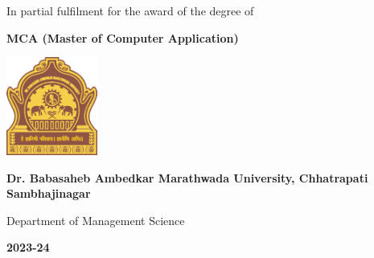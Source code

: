 \begin{titlepage}
{\begin{minipage}{\dimexpr\textwidth-2\fboxsep-2\fboxrule\relax}
\begin{center}
    {In partial fulfilment for the award of the degree of \par}
    \vspace{0.2cm}
    {\large \textbf{MCA (Master of Computer Application)} \par}
    \vspace{0.7cm}

\vspace{0.2cm}
\includegraphics[width=30mm]{Images/iitb_logo.png}
    \vspace{0.2cm}

    
    {\large \textbf{Dr. Babasaheb Ambedkar Marathwada University, Chhatrapati Sambhajinagar}\par}
    \vspace{0.1cm}
    {\large Department of Management Science \par}
    \vspace{0.1cm}
    {\large \textbf{2023-24}}

\end{center}
\vspace{0.5cm}
\end{minipage}%
}
\end{titlepage}